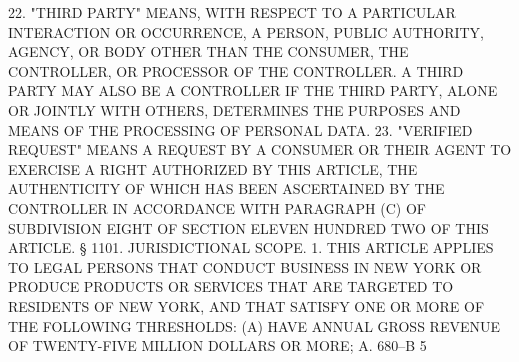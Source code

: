    22.  "THIRD  PARTY" MEANS, WITH RESPECT TO A PARTICULAR INTERACTION OR
 OCCURRENCE, A PERSON, PUBLIC AUTHORITY, AGENCY, OR BODY OTHER  THAN  THE
 CONSUMER, THE CONTROLLER, OR PROCESSOR OF THE CONTROLLER.  A THIRD PARTY
 MAY  ALSO  BE  A  CONTROLLER  IF  THE THIRD PARTY, ALONE OR JOINTLY WITH
 OTHERS, DETERMINES THE PURPOSES AND MEANS OF THE PROCESSING OF  PERSONAL
 DATA.
   23. "VERIFIED REQUEST" MEANS A REQUEST BY A CONSUMER OR THEIR AGENT TO
 EXERCISE  A  RIGHT AUTHORIZED BY THIS ARTICLE, THE AUTHENTICITY OF WHICH
 HAS BEEN ASCERTAINED BY THE CONTROLLER IN ACCORDANCE WITH PARAGRAPH  (C)
 OF SUBDIVISION EIGHT OF SECTION ELEVEN HUNDRED TWO OF THIS ARTICLE.
   § 1101. JURISDICTIONAL SCOPE. 1. THIS ARTICLE APPLIES TO LEGAL PERSONS
 THAT  CONDUCT  BUSINESS IN NEW YORK OR PRODUCE PRODUCTS OR SERVICES THAT
 ARE TARGETED TO RESIDENTS OF NEW YORK, AND THAT SATISFY ONE OR  MORE  OF
 THE FOLLOWING THRESHOLDS:
   (A) HAVE ANNUAL GROSS REVENUE OF TWENTY-FIVE MILLION DOLLARS OR MORE;
 A. 680--B                           5
 
